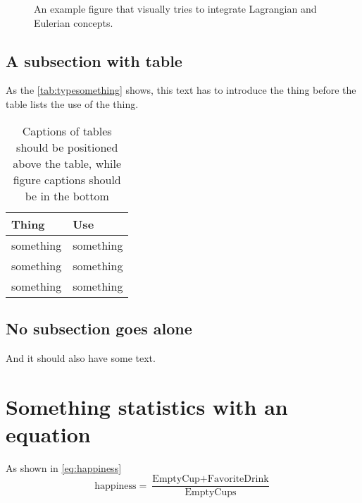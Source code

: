\begin{figure}[htp]
	\begin{center}
		\begin{minipage}{\textwidth}
			\centering
			\caption[An example figure.]{An example figure that visually tries to integrate Lagrangian and Eulerian concepts.}
			\label{fig:example}
		\end{minipage}
	\end{center}
\end{figure}

		
\subsection{A subsection with table}
\label{subsec:somesome}
		
As the \autoref{tab:typesomething} shows, this text has to introduce the thing before the table lists the use of the thing.
		
		
\begin{table}[hb] %
	\centering
	\caption{Captions of tables should be positioned above the table, while figure captions should be in the bottom}
	\begin{tabular}{ll}
		\hline
		\textbf{Thing} & \textbf{Use} \\
		\hline
		something & something \\
		something & something \\
		something & something \\
		\hline
	\end{tabular}
	\label{tab:typesomething}
\end{table}
		
\subsection{No subsection goes alone}
\label{subsec:somenoth}

And it should also have some text.


\section{Something statistics with an equation}
\label{sec:somestatistics}
	
As shown in \autoref{eq:happiness}
\begin{equation}\label{eq:happiness}
	\mbox{happiness}=\frac{\mbox{EmptyCup}+\mbox{FavoriteDrink}}{\mbox{EmptyCups}}
\end{equation}	
	

